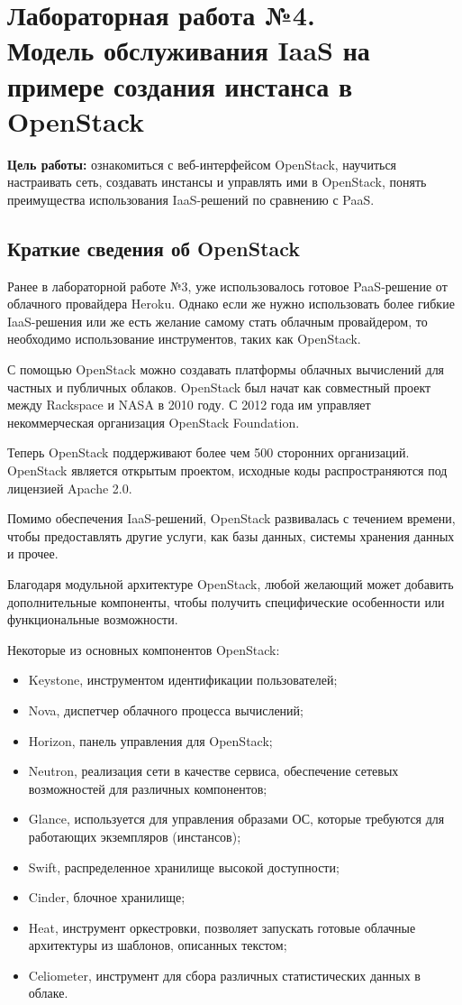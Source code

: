 \section[ЛР №4. Модель обслуживания IaaS, OpenStack]{Лабораторная работа №4. \\
Модель обслуживания IaaS на примере создания инстанса в OpenStack}

\textbf{Цель работы:} ознакомиться с веб-интерфейсом OpenStack, научиться настраивать сеть, создавать инстансы и управлять ими в OpenStack, понять преимущества использования IaaS-решений по сравнению с PaaS.

\subsection{Краткие сведения об OpenStack}

Ранее в лабораторной работе №3, уже использовалось готовое PaaS-решение от облачного провайдера Heroku.
Однако если же нужно использовать более гибкие IaaS-решения или же есть желание самому стать облачным провайдером, то необходимо использование инструментов, таких как OpenStack.

С помощью OpenStack можно создавать платформы облачных вычислений для частных и публичных облаков.
OpenStack был начат как совместный проект между Rackspace и NASA в 2010 году.
С 2012 года им управляет некоммерческая организация OpenStack Foundation.

Теперь OpenStack поддерживают более чем 500 сторонних организаций.
OpenStack является открытым проектом, исходные коды распространяются под лицензией Apache 2.0.

Помимо обеспечения IaaS-решений, OpenStack развивалась с течением времени, чтобы предоставлять другие услуги, как базы данных, системы хранения данных и прочее.

Благодаря модульной архитектуре OpenStack, любой желающий может добавить дополнительные компоненты, чтобы получить специфические особенности или функциональные возможности.

Некоторые из основных компонентов OpenStack:
\begin{itemize}
    \item Keystone, инструментом идентификации пользователей;
    \item Nova, диспетчер облачного процесса вычислений;
    \item Horizon, панель управления для OpenStack;
    \item Neutron, реализация сети в качестве сервиса, обеспечение сетевых возможностей для различных компонентов;
    \item Glance, используется для управления образами ОС, которые требуются для работающих экземпляров (инстансов);
    \item Swift, распределенное хранилище высокой доступности;
    \item Cinder, блочное хранилище;
    \item Heat, инструмент оркестровки, позволяет запускать готовые облачные архитектуры из шаблонов, описанных текстом;
    \item Celiometer, инструмент для сбора различных статистических данных в облаке.
\end{itemize}

